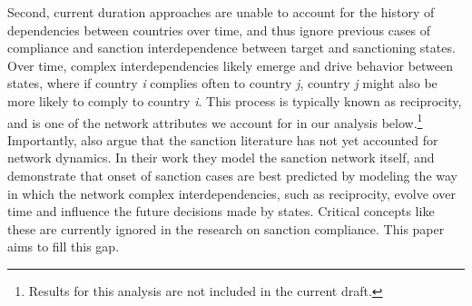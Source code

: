 Second, current duration approaches are unable to account for the history of dependencies between countries over time, and thus ignore previous cases of compliance and sanction interdependence between target and sanctioning states.  Over time, complex interdependencies likely emerge and drive behavior between states, where if country \textit{i} complies often to country \textit{j}, country \textit{j} might also be more likely to comply to country \textit{i}. This process is typically known as reciprocity, and is one of the network attributes we account for in our analysis below.\footnote{Results for this analysis are not included in the current draft.} Importantly, \citet{cranmer2014reciprocity} also argue that the sanction literature has not yet accounted for network dynamics. In their work they model the sanction network itself, and demonstrate that onset of sanction cases are best predicted by modeling the way in which the network complex interdependencies, such as reciprocity, evolve over time and influence the future decisions made by states. Critical concepts like these are currently ignored in the research on sanction compliance. This paper aims to fill this gap. 



